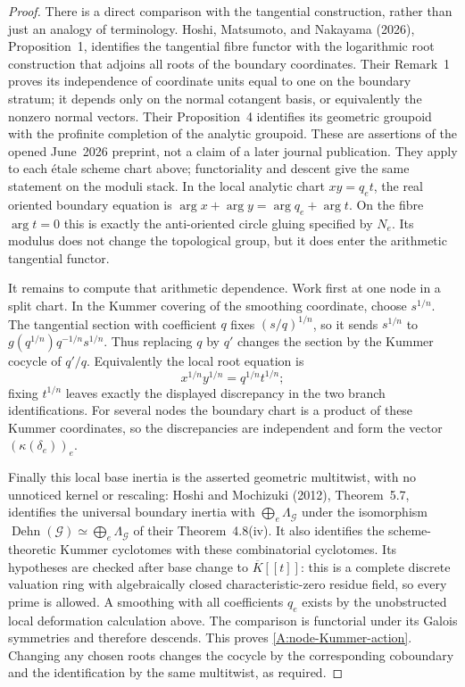 \begin{proof}
There is a direct comparison with the tangential construction, rather
than just an analogy of terminology. Hoshi, Matsumoto, and Nakayama
(2026), Proposition~1, identifies the tangential fibre functor with the
logarithmic root construction that adjoins all roots of the boundary
coordinates. Their Remark~1 proves its independence of coordinate
units equal to one on the boundary stratum; it depends only on the
normal cotangent basis, or equivalently the nonzero normal vectors.
Their Proposition~4 identifies its geometric groupoid with the
profinite completion of the analytic groupoid. These are assertions
of the opened June~2026 preprint, not a claim of a later journal
publication. They apply to each \'etale scheme chart above; functoriality
and descent give the same statement on the moduli stack. In the local
analytic chart $xy=q_e t$, the real oriented boundary equation is
$\arg x+\arg y=\arg q_e+\arg t$. On the fibre $\arg t=0$ this is
exactly the anti-oriented circle gluing specified by $N_e$. Its modulus
does not change the topological group, but it does enter the arithmetic
tangential functor.

It remains to compute that arithmetic dependence. Work first at one
node in a split chart. In the Kummer covering of the smoothing
coordinate, choose $s^{1/n}$. The tangential section with coefficient
$q$ fixes $(s/q)^{1/n}$, so it sends $s^{1/n}$ to
$g(q^{1/n})q^{-1/n}s^{1/n}$. Thus replacing $q$ by $q'$ changes the
section by the Kummer cocycle of $q'/q$. Equivalently the local root
equation is
\[
 x^{1/n}y^{1/n}=q^{1/n}t^{1/n};
\]
fixing $t^{1/n}$ leaves exactly the displayed discrepancy in the two
branch identifications. For several nodes the boundary chart is a
product of these Kummer coordinates, so the discrepancies are
independent and form the vector $(\kappa(\delta_e))_e$.

Finally this local base inertia is the asserted geometric multitwist,
with no unnoticed kernel or rescaling: Hoshi and Mochizuki (2012),
Theorem~5.7, identifies the universal boundary inertia with
$\bigoplus_e\Lambda_{\mathcal G}$ under the isomorphism
$\operatorname{Dehn}(\mathcal G)\simeq\bigoplus_e\Lambda_{\mathcal G}$
of their Theorem~4.8(iv). It also identifies the scheme-theoretic
Kummer cyclotomes with these combinatorial cyclotomes. Its hypotheses
are checked after base change to $\overline K[[t]]$: this is a complete
discrete valuation ring with algebraically closed characteristic-zero
residue field, so every prime is allowed. A smoothing with all
coefficients $q_e$ exists by the unobstructed local deformation
calculation above. The comparison is functorial under its Galois
symmetries and therefore descends. This proves
\eqref{A:node-Kummer-action}. Changing any chosen roots changes the
cocycle by the corresponding coboundary and the identification by the
same multitwist, as required.
\end{proof}

